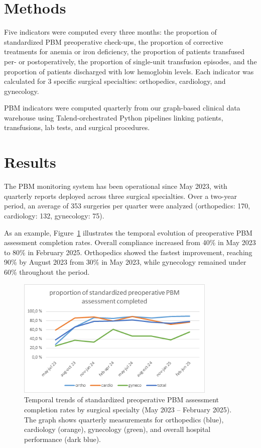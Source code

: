 \documentclass{IOS-Book-Article}
\begin{document}
\section{Methods}

Five indicators were computed every three months: the proportion of standardized PBM preoperative check-ups,
 the proportion of corrective treatments for anemia or iron deficiency, the proportion of patients 
 transfused per- or postoperatively, the proportion of single-unit transfusion episodes, and the 
 proportion of patients discharged with low hemoglobin levels. Each indicator was calculated for 3 
 specific surgical specialties: orthopedics, cardiology, and gynecology. 

PBM indicators were computed quarterly from our graph-based clinical data warehouse \cite{Artemova2019}
using Talend-orchestrated Python pipelines linking patients, transfusions, lab tests, and surgical 
procedures.

\section{Results}

The PBM monitoring system has been operational since May 2023, with quarterly 
reports deployed across three surgical specialties. Over a two-year period, an 
average of 353 surgeries per quarter were analyzed (orthopedics: 170, 
cardiology: 132, gynecology: 75).

As an example, Figure~\ref{fig:pbm_trends} illustrates the temporal evolution of preoperative 
PBM assessment completion rates. Overall compliance increased from 40\% in May 
2023 to 80\% in February 2025. Orthopedics showed the fastest improvement, 
reaching 90\% by August 2023 from 30\% in May 2023, while gynecology remained under
60\% throughout the period.

\begin{figure}[h!]
\vspace{-1em}
\centering
\includegraphics[width=0.85\textwidth]{figure.png}
\caption{Temporal trends of standardized preoperative PBM assessment completion rates by surgical specialty (May 2023 -- February 2025). The graph shows quarterly measurements for orthopedics (blue), cardiology (orange), gynecology (green), and overall hospital performance (dark blue).}
\label{fig:pbm_trends}
\vspace{-1em}
\end{figure}
\end{document}
